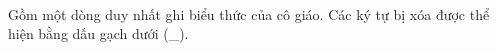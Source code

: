 \\   Gồm một dòng duy nhất ghi biểu thức của cô giáo. Các ký tự bị xóa được thể hiện bằng dấu gạch dưới (\_).